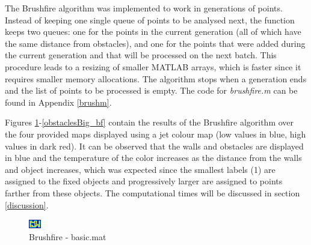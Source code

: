 \documentclass[journal]{IEEEtran}
\begin{document}
The Brushfire algorithm was implemented to work in generations of points. Instead of keeping one single queue of points to be analysed next, the function keeps two queues: one for the points in the current generation (all of which have the same distance from obstacles), and one for the points that were added during the current generation and that will be processed on the next batch. This procedure leads to a resizing of smaller MATLAB arrays, which is faster since it requires smaller memory allocations. The algorithm stops when a generation ends and the list of points to be processed is empty. The code for \textit{brushfire.m} can be found in Appendix \ref{brushm}.

Figures \ref{basic_bf}-\ref{obstaclesBig_bf} contain the results of the Brushfire algorithm over the four provided maps displayed using a jet colour map (low values in blue, high values in dark red). It can be observed that the walls and obstacles are displayed in blue and the temperature of the color increases as the distance from the walls and object increases, which was expected since the smallest labels (1) are assigned to the fixed objects and progressively larger are assigned to points farther from these objects. The computational times will be discussed in section \ref{discussion}.


\begin{figure}\label{basic_bf}
	\centering
	\includegraphics[width=0.8\linewidth]{figures/basic_bf.png}
	\caption{Brushfire - basic.mat}
\end{figure}
\end{document}
